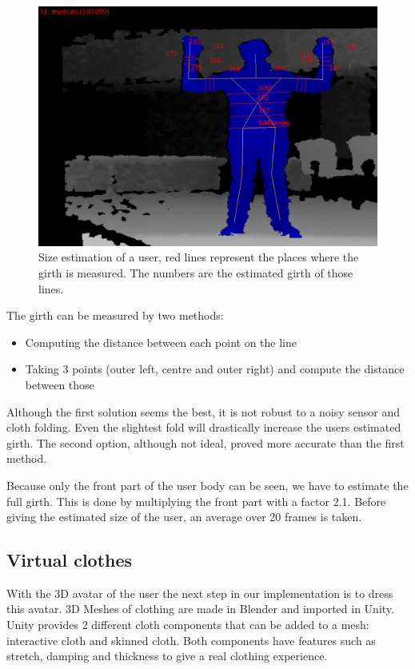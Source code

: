 \documentclass[twocolumn,a4paper]{article}
\begin{document}
\begin{figure}[htp]
\centering
\includegraphics[scale=0.4]{size_estimation.png} 
\caption{Size estimation of a user, red lines represent the places where the girth is measured. The numbers are the estimated girth of those lines.}
\label{fig:size_estimation}
\end{figure}

The girth can be measured by two methods:
\begin{itemize}
\setlength{\itemsep}{0pt}
  \setlength{\parskip}{0pt}
  \setlength{\parsep}{0pt}
\item Computing the distance between each point on the line
\item Taking 3 points (outer left, centre and outer right) and compute the distance between those
\end{itemize}
Although the first solution seems the best, it is not robust to a noisy sensor and cloth folding. Even the slightest fold will drastically increase the users estimated girth.
The second option, although not ideal, proved more accurate than the first method.

Because only the front part of the user body can be seen, we have to estimate the full girth. This is done by multiplying the front part with a factor 2.1. Before giving the estimated size of the user, an average over 20 frames is taken.


\subsection{Virtual clothes}
\label{sec:virtual_clothes}
With the 3D avatar of the user the next step in our implementation is to dress this avatar. 3D Meshes of clothing are made in Blender and imported in Unity. Unity provides 2 different cloth components that can be added to a mesh: interactive cloth and skinned cloth. Both components have features such as stretch, damping and thickness to give a real clothing experience.
\end{document}
